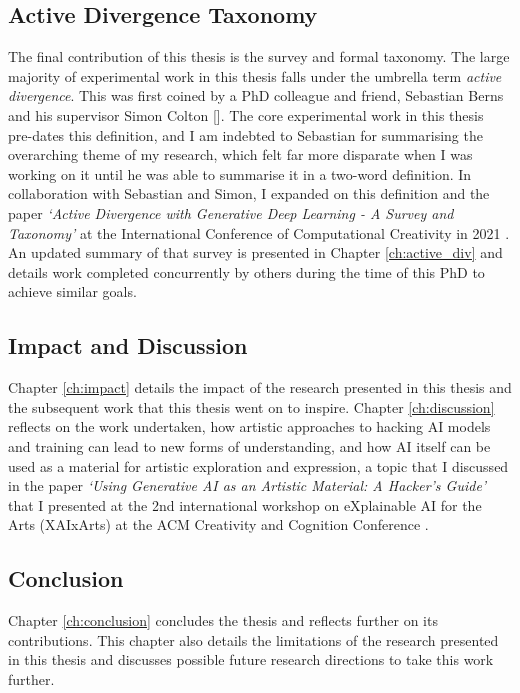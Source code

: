 \subsection{Active Divergence Taxonomy}

The final contribution of this thesis is the survey and formal taxonomy. 
The large majority of experimental work in this thesis falls under the umbrella term \textit{active divergence}. 
This was first coined by a PhD colleague and friend, Sebastian Berns and his supervisor Simon Colton [\citeyear{berns2020bridging}]. 
The core experimental work in this thesis pre-dates this definition, and I am indebted to Sebastian for summarising the overarching theme of my research, which felt far more disparate when I was working on it until he was able to summarise it in a two-word definition. 
In collaboration with Sebastian and Simon, I expanded on this definition and the paper \textit{`Active Divergence with Generative Deep Learning - A Survey and Taxonomy'} at the International Conference of Computational Creativity in 2021 \citep{broad2021active}.
An updated summary of that survey is presented in Chapter \ref{ch:active_div} and details work completed concurrently by others during the time of this PhD to achieve similar goals.

\subsection{Impact and Discussion}

Chapter \ref{ch:impact} details the impact of the research presented in this thesis and the subsequent work that this thesis went on to inspire. Chapter \ref{ch:discussion} reflects on the work undertaken, how artistic approaches to hacking AI models and training can lead to new forms of understanding, and how AI itself can be used as a material for artistic exploration and expression, a topic that I discussed in the paper \textit{`Using Generative AI as an Artistic Material: A Hacker's Guide'} that I presented at the 2nd international workshop on eXplainable AI for the Arts (XAIxArts) at the ACM Creativity and Cognition Conference \citep{broad2024using}.

\subsection{Conclusion}

Chapter \ref{ch:conclusion} concludes the thesis and reflects further on its contributions.
This chapter also details the limitations of the research presented in this thesis and discusses possible future research directions to take this work further.

